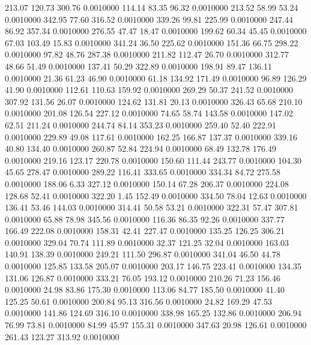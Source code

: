  213.07  120.73  300.76   0.0010000
 114.14   83.35   96.32   0.0010000
 213.52   58.99   53.24   0.0010000
 342.95   77.60  316.52   0.0010000
 339.26   99.81  225.99   0.0010000
 247.44   86.92  357.34   0.0010000
 276.55   47.47   18.47   0.0010000
 199.62   60.34   45.45   0.0010000
  67.03  103.49   15.83   0.0010000
 341.24   36.50  225.62   0.0010000
 151.36   66.75  298.22   0.0010000
  97.82   48.76  287.38   0.0010000
 211.82  112.47   26.70   0.0010000
 312.77   48.66   51.49   0.0010000
 137.41   50.29  322.89   0.0010000
 198.91   89.47  136.11   0.0010000
  21.36   61.23   46.90   0.0010000
  61.18  134.92  171.49   0.0010000
  96.89  126.29   41.90   0.0010000
 112.61  110.63  159.92   0.0010000
 269.29   50.37  241.52   0.0010000
 307.92  131.56   26.07   0.0010000
 124.62  131.81   20.13   0.0010000
 326.43   65.68  210.10   0.0010000
 201.08  126.54  227.12   0.0010000
  74.65   58.74  143.58   0.0010000
 147.02   62.51  211.24   0.0010000
 244.74   84.14  353.23   0.0010000
 259.40   52.40  222.91   0.0010000
 229.89   49.08  117.61   0.0010000
 162.25  166.87  137.37   0.0010000
 339.16   40.80  134.40   0.0010000
 260.87   52.84  224.94   0.0010000
  68.49  132.78  176.49   0.0010000
 219.16  123.17  220.78   0.0010000
 150.60  111.44  243.77   0.0010000
 104.30   45.65  278.47   0.0010000
 289.22  116.41  333.65   0.0010000
 334.34   84.72  275.58   0.0010000
 188.06    6.33  327.12   0.0010000
 150.14   67.28  206.37   0.0010000
 224.08  128.68   52.41   0.0010000
 322.20    1.45  152.49   0.0010000
 334.50   78.04   12.63   0.0010000
 136.41   53.46  144.03   0.0010000
 314.41   50.58   53.21   0.0010000
 322.31   57.47  307.81   0.0010000
  65.88   78.98  345.56   0.0010000
 116.36   86.35   92.26   0.0010000
 337.77  166.49  222.08   0.0010000
 158.31   42.41  227.47   0.0010000
 135.25  126.25  306.21   0.0010000
 329.04   70.74  111.89   0.0010000
  32.37  121.25   32.04   0.0010000
 163.03  140.91  138.39   0.0010000
 249.21  111.50  296.87   0.0010000
 341.04   46.50   44.78   0.0010000
 125.85  133.58  205.07   0.0010000
 203.17  146.75  223.41   0.0010000
 134.35  131.06  126.87   0.0010000
 333.21   76.05  193.12   0.0010000
 210.26   71.23  156.46   0.0010000
  24.98   83.86  175.30   0.0010000
 113.06   84.77  185.50   0.0010000
  41.40  125.25   50.61   0.0010000
 200.84   95.13  316.56   0.0010000
  24.82  169.29   47.53   0.0010000
 141.86  124.69  316.10   0.0010000
 338.98  165.25  132.86   0.0010000
 206.94   76.99   73.81   0.0010000
  84.99   45.97  155.31   0.0010000
 347.63   20.98  126.61   0.0010000
 261.43  123.27  313.92   0.0010000
